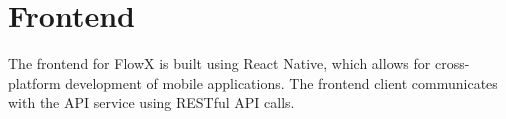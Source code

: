 \section{Frontend}
The frontend for FlowX is built using React Native, which allows for cross-platform development of mobile applications. The frontend client communicates with the API service using RESTful API calls.